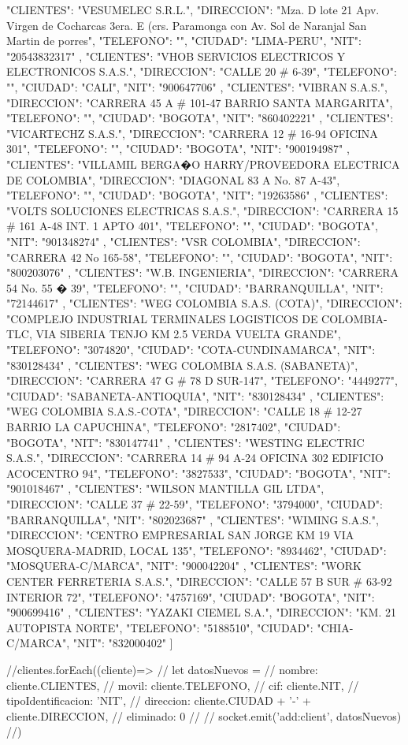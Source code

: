    {
   "CLIENTES": "VESUMELEC S.R.L.",
   "DIRECCION": "Mza. D lote 21 Apv. Virgen de Cocharcas 3era. E (crs. Paramonga con Av. Sol de Naranjal San Martin de porres",
   "TELEFONO": "",
   "CIUDAD": "LIMA-PERU",
   "NIT": "20543832317"
   },
   {
   "CLIENTES": "VHOB SERVICIOS ELECTRICOS Y ELECTRONICOS S.A.S.",
   "DIRECCION": "CALLE 20 # 6-39",
   "TELEFONO": "",
   "CIUDAD": "CALI",
   "NIT": "900647706"
   },
   {
   "CLIENTES": "VIBRAN S.A.S.",
   "DIRECCION": "CARRERA 45 A # 101-47 BARRIO SANTA MARGARITA",
   "TELEFONO": "",
   "CIUDAD": "BOGOTA",
   "NIT": "860402221"
   },
   {
   "CLIENTES": "VICARTECHZ S.A.S.",
   "DIRECCION": "CARRERA 12 # 16-94 OFICINA 301",
   "TELEFONO": "",
   "CIUDAD": "BOGOTA",
   "NIT": "900194987"
   },
   {
   "CLIENTES": "VILLAMIL BERGA�O HARRY/PROVEEDORA ELECTRICA DE COLOMBIA",
   "DIRECCION": "DIAGONAL 83 A No. 87 A-43",
   "TELEFONO": "",
   "CIUDAD": "BOGOTA",
   "NIT": "19263586"
   },
   {
   "CLIENTES": "VOLTS SOLUCIONES ELECTRICAS S.A.S.",
   "DIRECCION": "CARRERA 15 # 161 A-48 INT. 1 APTO 401",
   "TELEFONO": "",
   "CIUDAD": "BOGOTA",
   "NIT": "901348274"
   },
   {
   "CLIENTES": "VSR COLOMBIA",
   "DIRECCION": "CARRERA 42 No 165-58",
   "TELEFONO": "",
   "CIUDAD": "BOGOTA",
   "NIT": "800203076"
   },
   {
   "CLIENTES": "W.B. INGENIERIA",
   "DIRECCION": "CARRERA 54 No. 55 � 39",
   "TELEFONO": "",
   "CIUDAD": "BARRANQUILLA",
   "NIT": "72144617"
   },
   {
   "CLIENTES": "WEG COLOMBIA S.A.S. (COTA)",
   "DIRECCION": "COMPLEJO INDUSTRIAL TERMINALES LOGISTICOS DE COLOMBIA-TLC, VIA SIBERIA TENJO KM 2.5 VERDA VUELTA GRANDE",
   "TELEFONO": "3074820",
   "CIUDAD": "COTA-CUNDINAMARCA",
   "NIT": "830128434"
   },
   {
   "CLIENTES": "WEG COLOMBIA S.A.S. (SABANETA)",
   "DIRECCION": "CARRERA 47 G # 78 D SUR-147",
   "TELEFONO": "4449277",
   "CIUDAD": "SABANETA-ANTIOQUIA",
   "NIT": "830128434"
   },
   {
   "CLIENTES": "WEG COLOMBIA S.A.S.-COTA",
   "DIRECCION": "CALLE 18 # 12-27 BARRIO LA CAPUCHINA",
   "TELEFONO": "2817402",
   "CIUDAD": "BOGOTA",
   "NIT": "830147741"
   },
   {
   "CLIENTES": "WESTING ELECTRIC S.A.S.",
   "DIRECCION": "CARRERA 14 # 94 A-24 OFICINA 302 EDIFICIO ACOCENTRO 94",
   "TELEFONO": "3827533",
   "CIUDAD": "BOGOTA",
   "NIT": "901018467"
   },
   {
   "CLIENTES": "WILSON MANTILLA GIL LTDA",
   "DIRECCION": "CALLE 37 # 22-59",
   "TELEFONO": "3794000",
   "CIUDAD": "BARRANQUILLA",
   "NIT": "802023687"
   },
   {
   "CLIENTES": "WIMING S.A.S.",
   "DIRECCION": "CENTRO EMPRESARIAL SAN JORGE KM 19 VIA MOSQUERA-MADRID, LOCAL 135",
   "TELEFONO": "8934462",
   "CIUDAD": "MOSQUERA-C/MARCA",
   "NIT": "900042204"
   },
   {
   "CLIENTES": "WORK CENTER FERRETERIA S.A.S.",
   "DIRECCION": "CALLE 57 B SUR # 63-92 INTERIOR 72",
   "TELEFONO": "4757169",
   "CIUDAD": "BOGOTA",
   "NIT": "900699416"
   },
   {
   "CLIENTES": "YAZAKI CIEMEL S.A.",
   "DIRECCION": "KM. 21 AUTOPISTA NORTE",
   "TELEFONO": "5188510",
   "CIUDAD": "CHIA-C/MARCA",
   "NIT": "832000402"
   }]

 //clientes.forEach((cliente)=>{
 // let datosNuevos  = {
  //    nombre: cliente.CLIENTES,
  //    movil: cliente.TELEFONO,
  //    cif: cliente.NIT,
  //    tipoIdentificacion: 'NIT',
  //    direccion: cliente.CIUDAD + '-' + cliente.DIRECCION,
 //     eliminado: 0
 //  }
 //  socket.emit('add:client', datosNuevos)
 //})

   